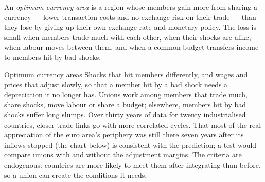 \begin{definition}\label{def:b3:exchange-rate-regimes:oca}
An \emph{optimum currency area} is a region whose members gain more from sharing a
currency --- lower transaction costs and no exchange risk on their trade --- than
they lose by giving up their own exchange rate and monetary policy. The loss is
small when members trade much with each other, when their shocks are alike, when
labour moves between them, and when a common budget transfers income to members
hit by bad shocks.
\end{definition}

\begin{omfigure}
\par{}
\end{omfigure}

\begin{model}{Optimum currency areas}
\assumes Shocks that hit members differently, and wages and prices that adjust
slowly, so that a member hit by a bad shock needs a depreciation it no longer has.
\predicts Unions work among members that trade much, share shocks, move labour or
share a budget; elsewhere, members hit by bad shocks suffer long slumps.
\tested Over thirty years of data for twenty industrialised countries, closer trade
links go with more correlated cycles. %
That most of the real appreciation of the euro area's periphery was still there
seven years after its inflows stopped (the chart below) is consistent with the
prediction; a test would compare unions with and without the adjustment margins.
\breaks The criteria are endogenous: countries are more likely to meet them after
integrating than before, so a union can create the conditions it needs.
\end{model}

